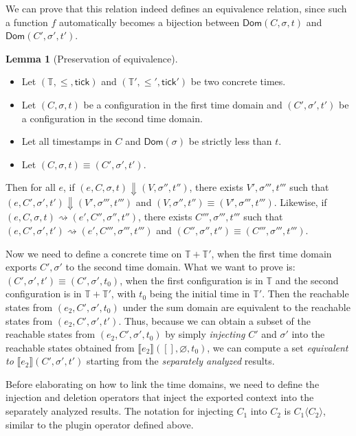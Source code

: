 \documentclass{article}
\theoremstyle{definition}
\newtheorem{lem}{Lemma}[section]
\newcommand*{\Time}{\mathbb{T}}
\newcommand*{\sembracket}[1]{\lBrack{#1}\rBrack}
\newcommand*{\tick}{\mathsf{tick}}
\newcommand*{\inject}[2]{{#1}\langle{#2}\rangle}
\begin{document}
We can prove that this relation indeed defines an equivalence relation, since such a function $f$ automatically becomes a bijection between $\mathsf{Dom}(C,\sigma,t)$ and $\mathsf{Dom}(C',\sigma',t')$.

\begin{lem}[Preservation of equivalence]
  $\:$

  \begin{itemize}
    \item Let $(\Time,\le,\tick)$ and $(\Time',\le',\tick')$ be two concrete times.
    \item Let $(C,\sigma,t)$ be a configuration in the first time domain and $(C',\sigma',t')$ be a configuration in the second time domain.
    \item Let all timestamps in $C$ and $\mathsf{Dom}(\sigma)$ be strictly less than $t$.
    \item Let $(C,\sigma,t)\equiv (C',\sigma',t')$.
  \end{itemize}

  Then for all $e$, if $(e,C,\sigma,t)\Downarrow(V,\sigma'',t'')$, there exists $V',\sigma''',t'''$ such that $(e,C',\sigma',t')\Downarrow(V',\sigma''',t''')$ and $(V,\sigma'',t'')\equiv(V',\sigma''',t''')$.
  Likewise, if $(e,C,\sigma,t)\rightsquigarrow(e',C'',\sigma'',t'')$, there exists $C''',\sigma''',t'''$ such that $(e,C',\sigma',t')\rightsquigarrow(e',C''',\sigma''',t''')$ and $(C'',\sigma'',t'')\equiv(C''',\sigma''',t''')$.
\end{lem}

Now we need to define a concrete time on $\Time+\Time'$, when the first time domain exports $C',\sigma'$ to the second time domain.
What we want to prove is: $(C',\sigma',t')\equiv(C',\sigma',t_{0})$, when the first configuration is in $\Time$ and the second configuration is in $\Time+\Time'$, with $t_{0}$ being the initial time in $\Time'$.
Then the reachable states from $(e_{2},C',\sigma',t_{0})$ under the sum domain are equivalent to the reachable states from $(e_{2},C',\sigma',t')$.
Thus, because we can obtain a subset of the reachable states from $(e_{2},C',\sigma',t_{0})$ by simply \emph{injecting} $C'$ and $\sigma'$ into the reachable states obtained from $\sembracket{e_{2}}([],\varnothing,t_{0})$, we can compute a set \textit{equivalent to} $\sembracket{e_{2}}(C',\sigma',t')$ starting from the \emph{separately analyzed} results.

Before elaborating on how to link the time domains, we need to define the injection and deletion operators that inject the exported context into the separately analyzed results.
The notation for injecting $C_{1}$ into $C_{2}$ is $\inject{C_{1}}{C_{2}}$, similar to the plugin operator defined above.
\end{document}
